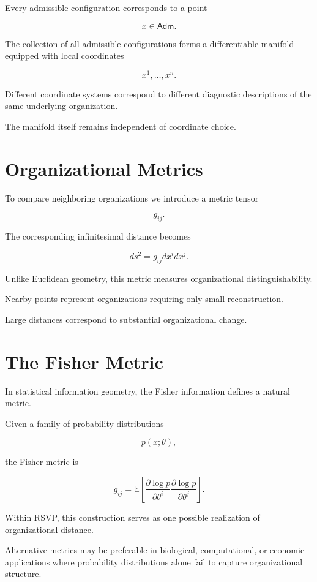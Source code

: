 \documentclass[11pt,oneside]{book}
\numberwithin{equation}{chapter}
\theoremstyle{definition}
\theoremstyle{plain}
\newcommand{\Adm}{\mathsf{Adm}}
\begin{document}
Every admissible configuration corresponds to a point

\[
x
\in
\Adm.
\]

The collection of all admissible configurations forms a differentiable
manifold equipped with local coordinates

\[
x^1,\ldots,x^n.
\]

Different coordinate systems correspond to different diagnostic
descriptions of the same underlying organization.

The manifold itself remains independent of coordinate choice.

\section{Organizational Metrics}

To compare neighboring organizations we introduce a metric tensor

\[
g_{ij}.
\]

The corresponding infinitesimal distance becomes

\[
ds^2
=
g_{ij}
dx^i
dx^j.
\]

Unlike Euclidean geometry, this metric measures organizational
distinguishability.

Nearby points represent organizations requiring only small
reconstruction.

Large distances correspond to substantial organizational change.

\section{The Fisher Metric}

In statistical information geometry, the Fisher information defines a
natural metric.

Given a family of probability distributions

\[
p(x;\theta),
\]

the Fisher metric is

\[
g_{ij}
=
\mathbb E
\left[
\frac{\partial\log p}
{\partial\theta^i}
\frac{\partial\log p}
{\partial\theta^j}
\right].
\]

Within RSVP, this construction serves as one possible realization of
organizational distance.

Alternative metrics may be preferable in biological, computational, or
economic applications where probability distributions alone fail to
capture organizational structure.
\end{document}
